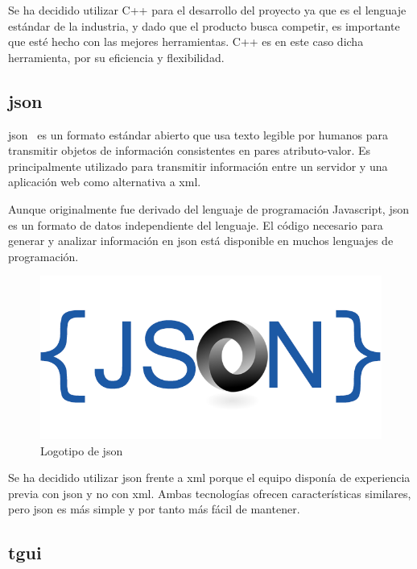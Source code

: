 		\FloatBarrier

		Se ha decidido utilizar C++ para el desarrollo del proyecto ya que es el lenguaje estándar de la industria, y dado que el producto busca competir, es importante que esté hecho con las mejores herramientas. C++ es en este caso dicha herramienta, por su eficiencia y flexibilidad.

	\subsection{\acrshort{json}}

		\acrfull{json}~\cite{json} es un formato estándar abierto que usa texto legible por humanos para transmitir objetos de información consistentes en pares atributo-valor. Es principalmente utilizado para transmitir información entre un servidor y una aplicación web como alternativa a \acrshort{xml}.

		Aunque originalmente fue derivado del lenguaje de programación Javascript, \acrshort{json} es un formato de datos independiente del lenguaje. El código necesario para generar y analizar información en \acrshort{json} está disponible en muchos lenguajes de programación.

		\begin{figure}[!htp]
			 \centering
			 \includegraphics[scale=.5]{fig/json}
			 \caption{Logotipo de \acrshort{json}}
			 \label{fig:json}
		\end{figure}

		\FloatBarrier

		Se ha decidido utilizar \acrshort{json} frente a \acrshort{xml} porque el equipo disponía de experiencia previa con \acrshort{json} y no con \acrshort{xml}. Ambas tecnologías ofrecen características similares, pero \acrshort{json} es más simple y por tanto más fácil de mantener.

	\subsection{\acrshort{tgui}}

